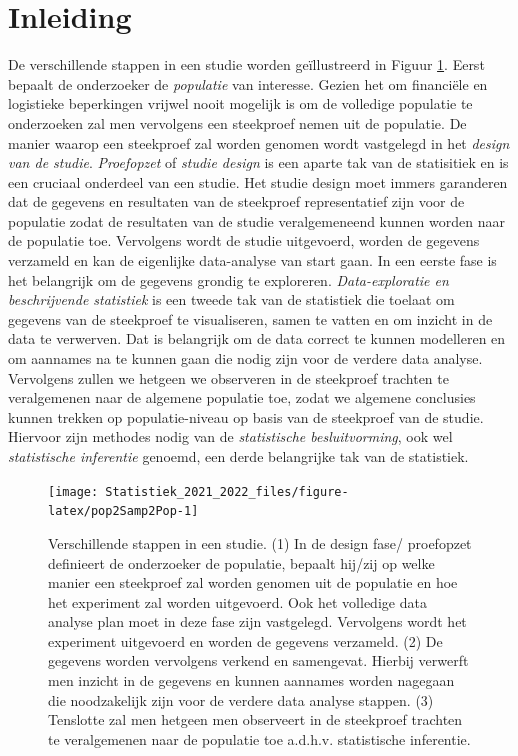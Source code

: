 \documentclass[
  12pt,dutch,coursenotes]{book}
\theoremstyle{definition}
\theoremstyle{definition}
\theoremstyle{definition}
\theoremstyle{definition}
\theoremstyle{remark}
\begin{document}
\hypertarget{inleiding-1}{%
\section{Inleiding}\label{inleiding-1}}

De verschillende stappen in een studie worden geïllustreerd in
Figuur \ref{fig:pop2Samp2Pop}.
Eerst bepaalt de onderzoeker de \emph{populatie} van interesse.
Gezien het om financiële en logistieke beperkingen vrijwel nooit mogelijk is om de volledige populatie te onderzoeken zal men vervolgens een steekproef nemen uit de populatie.
De manier waarop een steekproef zal worden genomen wordt vastgelegd in het \emph{design van de studie}.
\emph{Proefopzet} of \emph{studie design} is een aparte tak van de statisitiek en is een cruciaal onderdeel van een studie.
Het studie design moet immers garanderen dat de gegevens en resultaten van de steekproef representatief zijn voor de populatie zodat de resultaten van de studie veralgemeneend kunnen worden naar de populatie toe.
Vervolgens wordt de studie uitgevoerd, worden de gegevens verzameld en kan de eigenlijke data-analyse van start gaan.
In een eerste fase is het belangrijk om de gegevens grondig te exploreren.
\emph{Data-exploratie en beschrijvende statistiek} is een tweede tak van de statistiek die toelaat om gegevens van de steekproef te visualiseren, samen te vatten en om inzicht in de data te verwerven.
Dat is belangrijk om de data correct te kunnen modelleren en om aannames na te kunnen gaan die nodig zijn voor de verdere data analyse. Vervolgens zullen we hetgeen we observeren in de steekproef trachten te veralgemenen naar de algemene populatie toe, zodat we algemene conclusies kunnen trekken op populatie-niveau op basis van de steekproef van de studie. Hiervoor zijn methodes nodig van de \emph{statistische besluitvorming}, ook wel \emph{statistische inferentie} genoemd, een derde belangrijke tak van de statistiek.

\begin{figure}

{\centering \texttt{[image: Statistiek\_2021\_2022\_files/figure-latex/pop2Samp2Pop-1]} 

}

\caption{Verschillende stappen in een studie. (1) In de design fase/ proefopzet definieert de onderzoeker de populatie, bepaalt hij/zij op welke manier een steekproef zal worden genomen uit de populatie en hoe het experiment zal worden uitgevoerd. Ook het volledige data analyse plan moet in deze fase zijn vastgelegd. Vervolgens wordt het experiment uitgevoerd en worden de gegevens verzameld. (2) De gegevens worden vervolgens verkend en samengevat. Hierbij verwerft men inzicht in de gegevens en kunnen aannames worden nagegaan die noodzakelijk zijn voor de verdere data analyse stappen. (3) Tenslotte zal men hetgeen men observeert in de steekproef trachten te veralgemenen naar de populatie toe a.d.h.v. statistische inferentie.}\label{fig:pop2Samp2Pop}
\end{figure}
\end{document}

